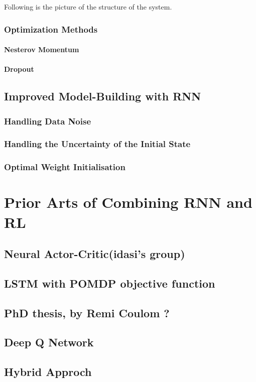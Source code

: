 \documentclass[officiallayout]{tktla}
\begin{document}
Following is the picture of the structure of the system. 

\subsection{Optimization Methods}
\subsubsection{Nesterov Momentum}
\subsubsection{Dropout}

\section{Improved Model-Building with RNN} 
\subsection{Handling Data Noise} 
\subsection{Handling the Uncertainty of the Initial State}
\subsection{Optimal Weight Initialisation}

\chapter{Prior Arts of Combining RNN and RL}
\section{Neural Actor-Critic(idasi's group)}
\section{LSTM with POMDP objective function}
\section{PhD thesis, by Remi Coulom ?}
\section{Deep Q Network}
\section{Hybrid Approch}
\end{document}

